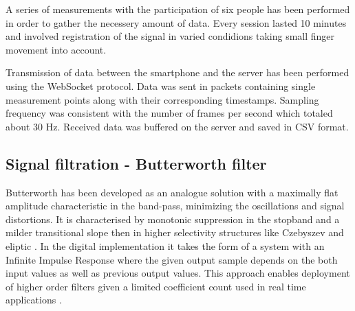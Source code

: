 \documentclass[journal]{IEEEtran}
\begin{document}
{A series of measurements with the participation of six people has been performed in order to gather the necessery amount of data. Every session lasted 10 minutes and involved registration of the signal in varied condidions taking small finger movement into account.

Transmission of data between the smartphone and the server has been performed using the WebSocket protocol. Data was sent in packets containing single measurement points along with their corresponding timestamps. Sampling frequency was consistent with the number of frames per second which totaled about 30 Hz. Received data was buffered on the server and saved in CSV format.

\subsection{Signal filtration - Butterworth filter}
Butterworth has been developed as an analogue solution with a maximally flat amplitude characteristic in the band-pass, minimizing the oscillations and signal distortions. It is characterised by monotonic suppression in the stopband and a milder transitional slope then in higher selectivity structures like Czebyszev and eliptic \cite{22}. In the digital implementation it takes the form of a system with an Infinite Impulse Response where the given output sample depends on the both input values as well as previous output values. This approach enables deployment of higher order filters given a limited coefficient count used in real time applications \cite{23}.

}
\end{document}
